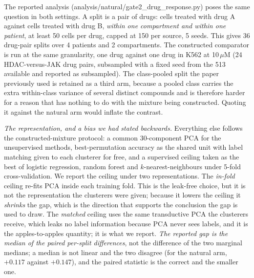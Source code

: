 \documentclass[11pt,letterpaper]{article}
\begin{document}
The reported analysis (analysis/natural/gate2\_drug\_response.py) poses the same question in both
settings. A split is a pair of drugs: cells treated with drug A against cells treated with drug B,
\emph{within one compartment and within one patient}, at least 50 cells per drug, capped at 150 per
source, 5 seeds. This gives 36 drug-pair splits over 4 patients and 2 compartments. The constructed
comparator is run at the same granularity, one drug against one drug in K562 at 10\,$\mu$M
(24 HDAC-versus-JAK drug pairs, subsampled with a fixed seed from the 513 available and reported as
subsampled). The class-pooled split the paper previously used is retained as a third arm, because a
pooled class carries the extra within-class variance of several distinct compounds and is therefore
harder for a reason that has nothing to do with the mixture being constructed. Quoting it against
the natural arm would inflate the contrast.

\emph{The representation, and a bias we had stated backwards.} Everything else follows the
constructed-mixture protocol: a common 30-component PCA for the unsupervised methods,
best-permutation accuracy as the shared unit with label matching given to each clusterer for free,
and a supervised ceiling taken as the best of logistic regression, random forest and
$k$-nearest-neighbours under 5-fold cross-validation. We report the ceiling under two
representations. The \emph{in-fold} ceiling re-fits PCA inside each training fold. This is the
leak-free choice, but it is not the representation the clusterers were given; because it lowers
the ceiling it \emph{shrinks} the gap, which is the direction that supports the conclusion the gap
is used to draw. The \emph{matched} ceiling uses the same transductive PCA the clusterers receive,
which leaks no label information because PCA never sees labels, and it is the apples-to-apples
quantity; it is what we report. \emph{The reported gap is the median of the paired per-split
differences}, not the difference of the two marginal medians; a median is not linear and the two
disagree (for the natural arm, $+0.117$ against $+0.147$), and the paired statistic is the correct
and the smaller one.
\end{document}

